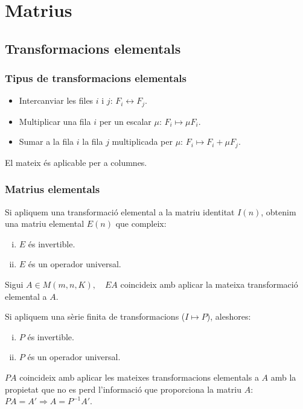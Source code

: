 \section{Matrius}
\subsection{Transformacions elementals}
\subsubsection*{Tipus de transformacions elementals}
\begin{itemize}
    \item Intercanviar les files $i$ i $j$: $F_{i} \leftrightarrow F_{j}$.
    \item Multiplicar una fila $i$ per un escalar $\mu$: $F_{i} \mapsto \mu F_{i}$.
    \item Sumar a la fila $i$ la fila $j$ multiplicada per $\mu$: $F_{i} \mapsto F_{i} + \mu F_{j}$.
\end{itemize}
El mateix és aplicable per a columnes.

\subsubsection*{Matrius elementals}
Si apliquem una transformació elemental a la matriu identitat $I(n)$, obtenim una matriu elemental $E(n)$ que compleix:
\begin{enumerate}[i)]
    \item $E$ és invertible.
    \item $E$ és un operador universal.
\end{enumerate}

Sigui $A \in M(m,n,K), \quad EA$ coincideix amb aplicar la mateixa transformació elemental a $A$.

Si apliquem una sèrie finita de transformacions ($I \mapsto P$), aleshores:
\begin{enumerate}[i)]
    \item $P$ és invertible.
    \item $P$ és un operador universal.
\end{enumerate}

$PA$ coincideix amb aplicar les mateixes transformacions elementals a $A$ amb la propietat que no es perd l'informació que proporciona la matriu $A$: $PA = A' \Rightarrow A = P^{-1} A'$.

